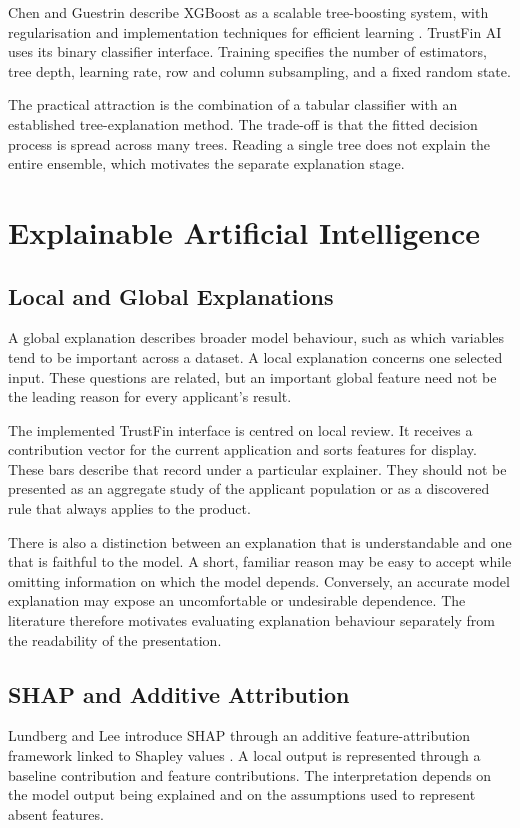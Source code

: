 Chen and Guestrin describe XGBoost as a scalable tree-boosting system, with regularisation and implementation techniques for efficient learning \cite{chen2016}. TrustFin AI uses its binary classifier interface. Training specifies the number of estimators, tree depth, learning rate, row and column subsampling, and a fixed random state.

The practical attraction is the combination of a tabular classifier with an established tree-explanation method. The trade-off is that the fitted decision process is spread across many trees. Reading a single tree does not explain the entire ensemble, which motivates the separate explanation stage.

\section{Explainable Artificial Intelligence}
\subsection{Local and Global Explanations}
A global explanation describes broader model behaviour, such as which variables tend to be important across a dataset. A local explanation concerns one selected input. These questions are related, but an important global feature need not be the leading reason for every applicant's result.

The implemented TrustFin interface is centred on local review. It receives a contribution vector for the current application and sorts features for display. These bars describe that record under a particular explainer. They should not be presented as an aggregate study of the applicant population or as a discovered rule that always applies to the product.

There is also a distinction between an explanation that is understandable and one that is faithful to the model. A short, familiar reason may be easy to accept while omitting information on which the model depends. Conversely, an accurate model explanation may expose an uncomfortable or undesirable dependence. The literature therefore motivates evaluating explanation behaviour separately from the readability of the presentation.

\subsection{SHAP and Additive Attribution}
Lundberg and Lee introduce SHAP through an additive feature-attribution framework linked to Shapley values \cite{lundberg2017}. A local output is represented through a baseline contribution and feature contributions. The interpretation depends on the model output being explained and on the assumptions used to represent absent features.

